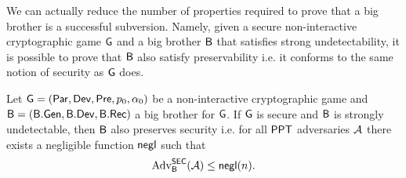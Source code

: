 We can actually reduce the number of properties required to prove that a big brother is a successful subversion. Namely, given a secure non-interactive cryptographic game $\cgame$ and a big brother $\bb$ that satisfies strong undetectability, it is possible to prove that $\bb$ also satisfy preservability i.e. it conforms to the same notion of security as $\cgame$ does. 

\begin{prop}
Let $\listcgame$ be a non-interactive cryptographic game and $\listbb$ a big brother for $\cgame$. If $\cgame$ is secure and $\bb$ is strongly undetectable, then $\bb$ also preserves security i.e. for all $\PPT$ adversaries $\adve$ there exists a negligible function $\negl$ such that
\begin{align*}
	\adv_{\bb}^{\secgame}(\adve) \leq \negl(n).
\end{align*}
\end{prop}

